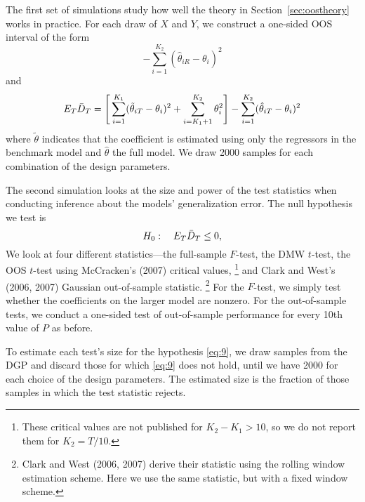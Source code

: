 \documentclass[12pt]{article}
\begin{document}
The first set of simulations study how well the theory in
Section~\ref{sec:oostheory} works in practice.  For each draw of $X$
and $Y$, we construct a one-sided OOS interval of the
form
\begin{equation*}
  [ \oosA - 1.28 \hat{\sigma}, \infty) \quad\text{with}\quad
  \sh^2 = \frac1P \sum_{t=R+1}^T (D_t - \oosA)^{2}
\end{equation*}
for $P$ set to every 10th value between 1 and $2T/3$.  We calculate
the percentage of these intervals that contain $\E_R \oosA$ and that
contain $\E_T \oosB$.  Since the data are i.i.d., both of these
quantities are easy to calculate:
\begin{equation*}
  E_R \oosA = \Bigg[\sum_{i=1}^{K_1} (\tilde{\theta}_{iR} - \theta_i)^2 +
  \sum_{i=K_1+1}^{K_2}\theta_i^2\Bigg] - \sum_{i=1}^{K_2} (\hat{\theta}_{iR} -
  \theta_i)^2
\end{equation*}
and
\begin{equation*}
  E_T \bar{D}_{T} = \Bigg[\sum_{i=1}^{K_1} (\tilde{\theta}_{iT} - \theta_i)^2 +
  \sum_{i=K_1+1}^{K_2}\theta_i^2\Bigg] - \sum_{i=1}^{K_2} (\hat{\theta}_{iT} -
  \theta_i)^2
\end{equation*}
where $\tilde{\theta}$ indicates that the coefficient is estimated
using only the regressors in the benchmark model and $\hat{\theta}$
the full model.  We draw 2000 samples for each combination of the
design parameters.

The second simulation looks at the size and power of the test
statistics when conducting inference about the models' generalization
error.  The null hypothesis we test is
\begin{equation}\label{eq:9}
  H_0:\quad E_T \bar{D}_{T} \leq 0,
\end{equation}
We look at four different statistics---the full-sample $F$-test, the
DMW $t$-test, the
OOS $t$-test using McCracken's (2007)
critical values,%
\footnote{These critical values are not published for
  $K_2-K_1>10$, so we do not report them for $K_2 = T/10$.} %
and Clark and West's (2006, 2007) Gaussian out-of-sample
statistic.%
\footnote{Clark and West (2006, 2007) derive their statistic
using the rolling window estimation scheme.  Here we use the same
statistic, but with a fixed window scheme.} %
For the $F$-test, we simply test whether the coefficients on the larger
model are nonzero.  For the out-of-sample tests, we conduct a
one-sided test of out-of-sample performance for every 10th value of
$P$ as before.

To estimate each test's size for the hypothesis \eqref{eq:9}, we draw
samples from the DGP and discard those for which \eqref{eq:9} does
not hold, until we have 2000 for each choice of the design parameters.
The estimated size is the fraction of those samples in which the test
statistic rejects.
\end{document}
